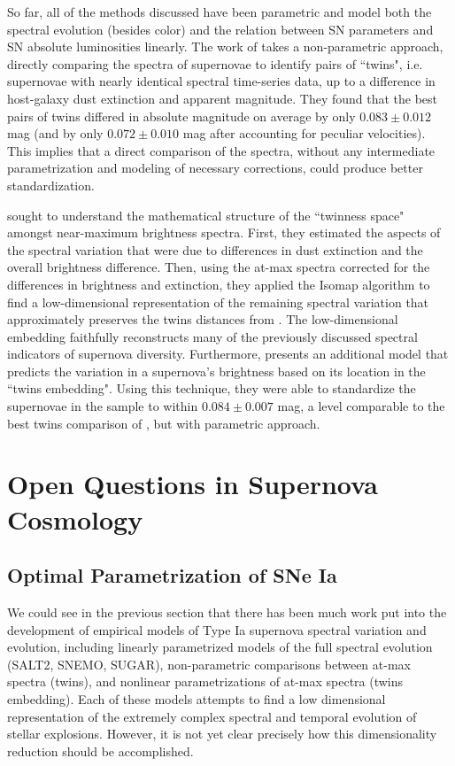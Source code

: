 So far, all of the methods discussed have been parametric and model both the spectral evolution (besides color) and the relation between SN parameters and SN absolute luminosities linearly. The work of \citet{fakhouri_improving_2015} takes a non-parametric approach, directly comparing the spectra of supernovae to identify pairs of ``twins", i.e. supernovae with nearly identical spectral time-series data, up to a difference in host-galaxy dust extinction and apparent magnitude. They found that the best pairs of twins differed in absolute magnitude on average by only $0.083 \pm 0.012$ mag (and by only $0.072 \pm 0.010$ mag after accounting for peculiar velocities). This implies that a direct comparison of the spectra, without any intermediate parametrization and modeling of necessary corrections, could produce better standardization.

\citet{boone_twins_2020a} sought to understand the mathematical structure of the ``twinness space" amongst near-maximum brightness spectra. First, they estimated the aspects of the spectral variation that were due to differences in dust extinction and the overall brightness difference. Then, using the at-max spectra corrected for the differences in brightness and extinction, they applied the Isomap algorithm \citep{tenenbaum_global_2000} to find a low-dimensional representation of the remaining spectral variation that approximately preserves the twins distances from \citet{fakhouri_improving_2015}. The low-dimensional embedding faithfully reconstructs many of the previously discussed spectral indicators of supernova diversity. Furthermore, \citet{boone_twins_2020b} presents an additional model that predicts the variation in a supernova's brightness based on its location in the ``twins embedding". Using this technique, they were able to standardize the supernovae in the sample to within $0.084 \pm 0.007$ mag, a level comparable to the best twins comparison of \citet{fakhouri_improving_2015}, but with parametric approach.

\section{Open Questions in Supernova Cosmology}
\subsection{Optimal Parametrization of SNe Ia}
We could see in the previous section that there has been much work put into the development of empirical models of Type Ia supernova spectral variation and evolution, including linearly parametrized models of the full spectral evolution (SALT2, SNEMO, SUGAR), non-parametric comparisons between at-max spectra (twins), and nonlinear parametrizations of at-max spectra (twins embedding). Each of these models attempts to find a low dimensional representation of the extremely complex spectral and temporal evolution of stellar explosions. However, it is not yet clear precisely how this dimensionality reduction should be accomplished.

